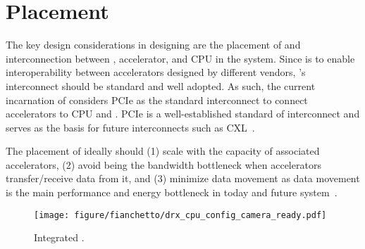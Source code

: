 \section{\drx Placement}
\label{sec:placement}

The key design considerations in designing \dmx are the placement of \drx and interconnection between \drx, accelerator, and CPU in the system.
%
Since \dmx is to enable interoperability between accelerators designed by different vendors, \drx's interconnect should be standard and well adopted.
%
As such, the current incarnation of \dmx considers PCIe as the standard interconnect to connect accelerators to CPU and \drx. 
%
PCIe is a well-established standard of interconnect and serves as the basis for future interconnects such as CXL~\cite{cxl-3-0-spec}.  
%

The placement of \drx ideally should (1) scale with the capacity of associated accelerators, (2) avoid being the bandwidth bottleneck when accelerators transfer/receive data from it, and (3) minimize data movement as data movement is the main performance and energy bottleneck in today and future system~\cite{horowitz:isscc:2014}.

\begin{figure}[ht!]
    \centering
    \texttt{[image: figure/fianchetto/drx\_cpu\_config\_camera\_ready.pdf]}
    \caption{Integrated \drx.}
    \label{fig:integrated-drx}
\end{figure}

